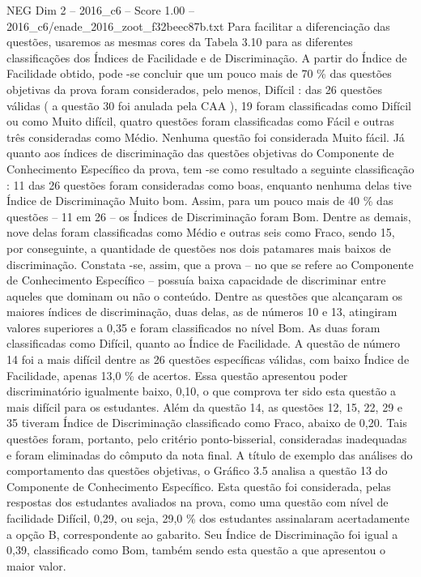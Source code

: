 \begin{textsample}{NEG Dim 2 – 2016\_c6 – Score 1.00 – 2016\_c6/enade\_2016\_zoot\_f32beec87b.txt}
Para facilitar a diferenciação das questões, usaremos as mesmas cores da Tabela 3.10 para as diferentes classificações dos Índices de Facilidade e de Discriminação.
A partir do Índice de Facilidade obtido, pode -se concluir que um pouco mais de 70 \% das questões objetivas da prova foram considerados, pelo menos, Difícil : das 26 questões válidas ( a questão 30 foi anulada pela CAA ), 19 foram classificadas como Difícil ou como Muito difícil, quatro questões foram classificadas como Fácil e outras três consideradas como Médio.
Nenhuma questão foi considerada Muito fácil.
Já quanto aos índices de discriminação das questões objetivas do Componente de Conhecimento Específico da prova, tem -se como resultado a seguinte classificação : 11 das 26 questões foram consideradas como boas, enquanto nenhuma delas tive Índice de Discriminação Muito bom.
Assim, para um pouco mais de 40 \% das questões – 11 em 26 – os Índices de Discriminação foram Bom.
Dentre as demais, nove delas foram classificadas como Médio e outras seis como Fraco, sendo 15, por conseguinte, a quantidade de questões nos dois patamares mais baixos de discriminação.
Constata -se, assim, que a prova – no que se refere ao Componente de Conhecimento Específico – possuía baixa capacidade de discriminar entre aqueles que dominam ou não o conteúdo.
Dentre as questões que alcançaram os maiores índices de discriminação, duas delas, as de números 10 e 13, atingiram valores superiores a 0,35 e foram classificados no nível Bom.
As duas foram classificadas como Difícil, quanto ao Índice de Facilidade.
A questão de número 14 foi a mais difícil dentre as 26 questões específicas válidas, com baixo Índice de Facilidade, apenas 13,0 \% de acertos.
Essa questão apresentou poder discriminatório igualmente baixo, 0,10, o que comprova ter sido esta questão a mais difícil para os estudantes.
Além da questão 14, as questões 12, 15, 22, 29 e 35 tiveram Índice de Discriminação classificado como Fraco, abaixo de 0,20.
Tais questões foram, portanto, pelo critério ponto-bisserial, consideradas inadequadas e foram eliminadas do cômputo da nota final.
A título de exemplo das análises do comportamento das questões objetivas, o Gráfico 3.5 analisa a questão 13 do Componente de Conhecimento Específico.
Esta questão foi considerada, pelas respostas dos estudantes avaliados na prova, como uma questão com nível de facilidade Difícil, 0,29, ou seja, 29,0 \% dos estudantes assinalaram acertadamente a opção B, correspondente ao gabarito.
Seu Índice de Discriminação foi igual a 0,39, classificado como Bom, também sendo esta questão a que apresentou o maior valor.

\end{textsample}
